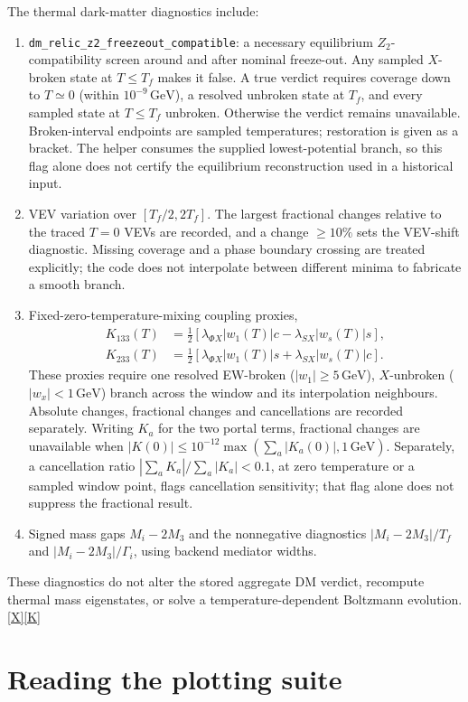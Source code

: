 \documentclass[11pt,a4paper]{article}
\newcommand{\code}[1]{\ifmmode\mbox{\ttfamily\detokenize{#1}}\else\nolinkurl{#1}\fi}
\newcommand{\src}[1]{\hyperlink{src:#1}{\textsf{[#1]}}}
\newcommand{\GeV}{\,\mathrm{GeV}}
\begin{document}
The thermal dark-matter diagnostics include:
\begin{enumerate}
\item \code{dm_relic_z2_freezeout_compatible}: a necessary equilibrium
$Z_2$-compatibility screen around and after nominal freeze-out. Any sampled
$X$-broken state at $T\le T_f$ makes it false. A true verdict requires
coverage down to $T\simeq0$ (within $10^{-9}\GeV$), a resolved unbroken
state at $T_f$, and every sampled state at $T\le T_f$ unbroken. Otherwise
the verdict remains unavailable. Broken-interval endpoints are sampled
temperatures; restoration is given as a bracket. The helper consumes the
supplied lowest-potential branch, so this flag alone does not certify the
equilibrium reconstruction used in a historical input.
\item VEV variation over $[T_f/2,2T_f]$. The largest fractional changes
relative to the traced $T=0$ VEVs are recorded, and a change
$\ge10\%$ sets the VEV-shift diagnostic. Missing coverage and a phase
boundary crossing are treated explicitly; the code does not interpolate
between different minima to fabricate a smooth branch.
\item Fixed-zero-temperature-mixing coupling proxies,
\begin{align}
 K_{133}(T)&=\tfrac12[\lambda_{\Phi X}|w_1(T)|c-\lambda_{SX}|w_s(T)|s],\nonumber\\
 K_{233}(T)&=\tfrac12[\lambda_{\Phi X}|w_1(T)|s+\lambda_{SX}|w_s(T)|c].
\end{align}
These proxies require one resolved EW-broken ($|w_1|\ge5\GeV$),
$X$-unbroken ($|w_x|<1\GeV$) branch across the window and its
interpolation neighbours. Absolute changes, fractional changes and
cancellations are recorded separately. Writing $K_a$ for the two portal
terms, fractional changes are unavailable when
$|K(0)|\le10^{-12}\max(\sum_a|K_a(0)|,1\GeV)$.
Separately, a cancellation ratio
$|\sum_a K_a|/\sum_a|K_a|<0.1$, at zero temperature or a sampled window
point, flags cancellation sensitivity; that flag alone does not suppress
the fractional result.
\item Signed mass gaps $M_i-2M_3$ and the nonnegative diagnostics
$|M_i-2M_3|/T_f$ and $|M_i-2M_3|/\Gamma_i$, using backend mediator widths.
\end{enumerate}
These diagnostics do not alter the stored aggregate DM verdict, recompute
thermal mass eigenstates, or solve a temperature-dependent Boltzmann
evolution. \src{X}\src{K}

\section{Reading the plotting suite}
\label{sec:plots}
\end{document}
